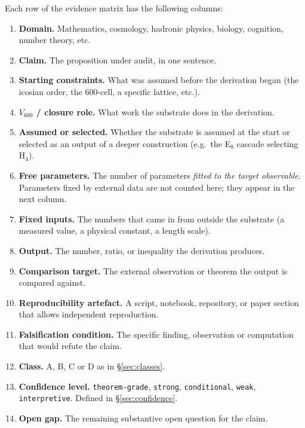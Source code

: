 \documentclass[11pt,a4paper]{article}
\newcommand{\Vsix}{V_{600}}
\begin{document}
Each row of the evidence matrix has the following columns:

\begin{enumerate}[leftmargin=*]
  \item \textbf{Domain.} Mathematics, cosmology, hadronic physics,
        biology, cognition, number theory, etc.
  \item \textbf{Claim.} The proposition under audit, in one
        sentence.
  \item \textbf{Starting constraints.} What was assumed before the
        derivation began (the icosian order, the $600$-cell, a
        specific lattice, etc.).
  \item \textbf{$\Vsix$ / closure role.} What work the substrate
        does in the derivation.
  \item \textbf{Assumed or selected.} Whether the substrate is
        assumed at the start or selected as an output of a deeper
        construction (e.g.\ the E$_8$ cascade selecting H$_4$).
  \item \textbf{Free parameters.} The number of parameters
        \emph{fitted to the target observable}. Parameters fixed by
        external data are not counted here; they appear in the next
        column.
  \item \textbf{Fixed inputs.} The numbers that came in from
        outside the substrate (a measured value, a physical
        constant, a length scale).
  \item \textbf{Output.} The number, ratio, or inequality the
        derivation produces.
  \item \textbf{Comparison target.} The external observation or
        theorem the output is compared against.
  \item \textbf{Reproducibility artefact.} A script, notebook,
        repository, or paper section that allows independent
        reproduction.
  \item \textbf{Falsification condition.} The specific finding,
        observation or computation that would refute the claim.
  \item \textbf{Class.} A, B, C or D as in \S\ref{sec:classes}.
  \item \textbf{Confidence level.} \texttt{theorem-grade},
        \texttt{strong}, \texttt{conditional}, \texttt{weak},
        \texttt{interpretive}. Defined in
        \S\ref{sec:confidence}.
  \item \textbf{Open gap.} The remaining substantive open question
        for the claim.
\end{enumerate}
\end{document}
